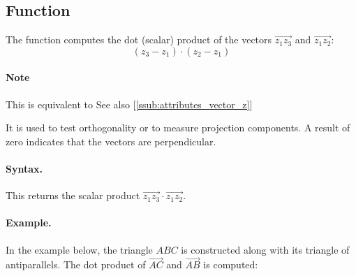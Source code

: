 \subsection{Function } %
\label{sub:dot_or_scalar_product}

The function  computes the dot (scalar) product of the vectors $\overrightarrow{z_1z_3}$ and $\overrightarrow{z_1z_2}$:
\[
(z_3 - z_1) \cdot (z_2 - z_1)
\]

\paragraph{Note} This is equivalent to  See also [\ref{ssub:attributes_vector_z}]%
\label{par:note_dot}

\noindent
It is used to test orthogonality or to measure projection components. A result of zero indicates that the vectors are perpendicular.

\paragraph{Syntax.}
\begin{center}
\end{center}
%
This returns the scalar product $\overrightarrow{z_1z_3} \cdot \overrightarrow{z_1z_2}$.

\paragraph{Example.}
In the example below, the triangle $ABC$ is constructed along with its triangle of antiparallels. The dot product of $\overrightarrow{AC}$ and $\overrightarrow{AB}$ is computed:


